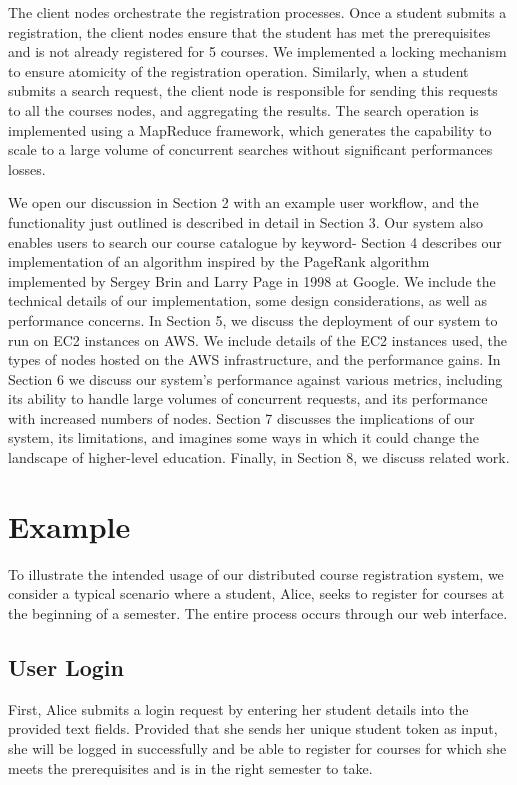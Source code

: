 \documentclass[sigplan, screen, 10pt]{acmart}
\begin{document}
The client nodes orchestrate the registration processes. Once a student submits a registration, the client nodes ensure that the student has met the prerequisites and is not already registered for 5 courses. We implemented a locking mechanism to ensure atomicity of the registration operation. Similarly, when a student submits a search request, the client node is responsible for sending this requests to all the courses nodes, and aggregating the results. The search operation is implemented using a MapReduce framework, which generates the capability to scale to a large volume of concurrent searches without significant performances losses. 

We open our discussion in Section 2 with an example user workflow, and the functionality just outlined is described in detail in Section 3. Our system also enables users to search our course catalogue by keyword- Section 4 describes our implementation of an algorithm inspired by the PageRank algorithm implemented by Sergey Brin and Larry Page in 1998 at Google. We include the technical details of our implementation, some design considerations, as well as performance concerns. In Section 5, we discuss the deployment of our system to run on EC2 instances on AWS. We include details of the EC2 instances used, the types of nodes hosted on the AWS infrastructure, and the performance gains. In Section 6 we discuss our system’s performance against various metrics, including its ability to handle large volumes of concurrent requests, and its performance with increased numbers of nodes. Section 7 discusses the implications of our system, its limitations, and imagines some ways in which it could change the landscape of higher-level education. Finally, in Section 8, we discuss related work.

\section{Example}
\label{bg}

To illustrate the intended usage of our distributed course registration system, we consider a typical scenario where a student, Alice, seeks to register for courses at the beginning of a semester. The entire process occurs through our web interface.
\subsection{User Login}
First, Alice submits a login request by entering her student details into the provided text fields. Provided that she sends her unique student token as input, she will be logged in successfully and be able to register for courses for which she meets the prerequisites and is in the right semester to take.
\end{document}
